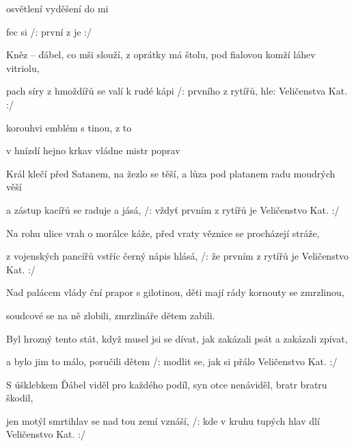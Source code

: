 

			

\zs
{} osvětlení  
 vyděšení  do mi

fec  si 
/:  první z  je   :/
\ks

\zs
Kněz -- ďábel, co mši slouží, z oprátky má štolu,
pod fialovou komží láhev vitriolu,

pach síry z hmoždířů se valí k rudé kápi
/: prvního z rytířů, hle: Veličenstva Kat. :/
\ks

\zr
{} korouhvi   emblém s tinou,
z    to 

v  hnízdí hejno krkav
 vládne mistr poprav
\kr

\zs
Král klečí před Satanem, na žezlo se těší,
a lůza pod platanem radu moudrých věší

a zástup kacířů se raduje a jásá,
/: vždyť prvním z rytířů je Veličenstvo Kat. :/
\ks

\zs
Na rohu ulice vrah o morálce káže,
před vraty věznice se procházejí stráže,

z vojenských pancířů vstříc černý nápis hlásá,
/: že prvním z rytířů je Veličenstvo Kat. :/
\ks

\zr
Nad palácem vlády ční prapor s gilotinou,
děti mají rády kornouty se zmrzlinou,

soudcové se na ně zlobili,
zmrzlináře dětem zabili.
\kr

\zs
Byl hrozný tento stát, když musel jsi se dívat,
jak zakázali psát a zakázali zpívat,

a bylo jim to málo, poručili dětem
/: modlit se, jak si přálo Veličenstvo Kat. :/
\ks

\zs
S úšklebkem Ďábel viděl pro každého podíl,
syn otce nenáviděl, bratr bratru škodil,

jen motýl smrtihlav se nad tou zemí vznáší,
/: kde v kruhu tupých hlav dlí Veličenstvo Kat. :/
\ks

\kp
